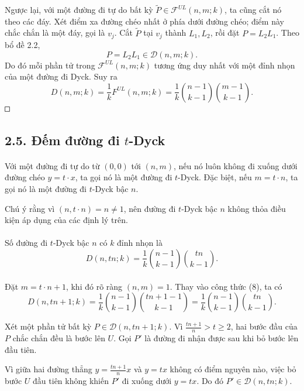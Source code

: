 \documentclass[11pt]{article}
\newcommand{\square}{\mathord{\vcenter{\hrule height .5pt
  \hbox{\vrule width .5pt height 5pt\kern5pt\vrule width .5pt}
  \hrule height .5pt}}}
\begin{document}
Ngược lại, với một đường đi tự do bất kỳ
\(\widetilde P\in\mathcal F^{UL}(n,m;k)\), ta cũng cắt nó theo các đáy. Xét
điểm xa đường chéo nhất ở phía dưới đường chéo; điểm này chắc chắn là một đáy,
gọi là \(v_j\). Cắt \(\widetilde P\) tại \(v_j\) thành \(L_1,L_2\), rồi đặt
\(P=L_2L_1\). Theo bổ đề 2.2,
\[
  P=L_2L_1\in\mathcal D(n,m;k).
\]
Do đó mỗi phần tử trong \(\mathcal F^{UL}(n,m;k)\) tương ứng duy nhất với một
đỉnh nhọn của một đường đi Dyck. Suy ra
\[
  D(n,m;k)=\frac1kF^{UL}(n,m;k)
  =\frac1k\binom{n-1}{k-1}\binom{m-1}{k-1}.
\]
\(\square\)

\subsection*{2.5. Đếm đường đi \(t\)-Dyck}

\paragraph{}
Với một đường đi tự do từ \((0,0)\) tới \((n,m)\), nếu nó luôn không đi xuống
dưới đường chéo \(y=t\cdot x\), ta gọi nó là một đường đi \(t\)-Dyck. Đặc
biệt, nếu \(m=t\cdot n\), ta gọi nó là một đường đi \(t\)-Dyck bậc \(n\).

Chú ý rằng vì \((n,t\cdot n)=n\ne1\), nên đường đi \(t\)-Dyck bậc \(n\) không
thỏa điều kiện áp dụng của các định lý trên.

\paragraph{}
Số đường đi \(t\)-Dyck bậc \(n\) có \(k\) đỉnh nhọn là
\[
  D(n,tn;k)=\frac1k\binom{n-1}{k-1}\binom{tn}{k-1}. \tag{9}
\]

\paragraph{}
Đặt \(m=t\cdot n+1\), khi đó rõ ràng \((n,m)=1\). Thay vào công thức (8), ta
có
\[
  D(n,tn+1;k)
  =\frac1k\binom{n-1}{k-1}\binom{tn+1-1}{k-1}
  =\frac1k\binom{n-1}{k-1}\binom{tn}{k-1}.
\]

Xét một phần tử bất kỳ \(P\in\mathcal D(n,tn+1;k)\). Vì
\(\frac{tn+1}{n}>t\ge2\), hai bước đầu của \(P\) chắc chắn đều là bước lên
\(U\). Gọi \(P'\) là đường đi nhận được sau khi bỏ bước lên đầu tiên.

Vì giữa hai đường thẳng \(y=\frac{tn+1}{n}x\) và \(y=tx\) không có điểm nguyên
nào, việc bỏ bước \(U\) đầu tiên không khiến \(P'\) đi xuống dưới \(y=tx\).
Do đó \(P'\in\mathcal D(n,tn;k)\).
\end{document}
